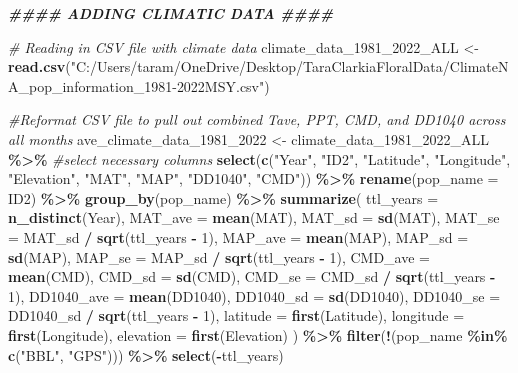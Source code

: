 \documentclass[
]{article}
\newenvironment{Shaded}{\begin{snugshade}}{\end{snugshade}}
\newcommand{\AttributeTok}[1]{\textcolor[rgb]{0.13,0.29,0.53}{#1}}
\newcommand{\CommentTok}[1]{\textcolor[rgb]{0.56,0.35,0.01}{\textit{#1}}}
\newcommand{\DecValTok}[1]{\textcolor[rgb]{0.00,0.00,0.81}{#1}}
\newcommand{\DocumentationTok}[1]{\textcolor[rgb]{0.56,0.35,0.01}{\textbf{\textit{#1}}}}
\newcommand{\FunctionTok}[1]{\textcolor[rgb]{0.13,0.29,0.53}{\textbf{#1}}}
\newcommand{\NormalTok}[1]{#1}
\newcommand{\OtherTok}[1]{\textcolor[rgb]{0.56,0.35,0.01}{#1}}
\newcommand{\SpecialCharTok}[1]{\textcolor[rgb]{0.81,0.36,0.00}{\textbf{#1}}}
\newcommand{\StringTok}[1]{\textcolor[rgb]{0.31,0.60,0.02}{#1}}
\begin{document}
\begin{Shaded}
\begin{Highlighting}[]
\DocumentationTok{\#\#\#\# ADDING CLIMATIC DATA \#\#\#\#}

\CommentTok{\# Reading in CSV file with climate data}
\NormalTok{climate\_data\_1981\_2022\_ALL }\OtherTok{\textless{}{-}} \FunctionTok{read.csv}\NormalTok{(}\StringTok{"C:/Users/taram/OneDrive/Desktop/TaraClarkiaFloralData/ClimateNA\_pop\_information\_1981{-}2022MSY.csv"}\NormalTok{)}

\CommentTok{\#Reformat CSV file to pull out combined Tave, PPT, CMD, and DD1040 across all months}
\NormalTok{ave\_climate\_data\_1981\_2022 }\OtherTok{\textless{}{-}}\NormalTok{ climate\_data\_1981\_2022\_ALL }\SpecialCharTok{\%\textgreater{}\%}
  \CommentTok{\#select necessary columns}
  \FunctionTok{select}\NormalTok{(}\FunctionTok{c}\NormalTok{(}\StringTok{"Year"}\NormalTok{, }\StringTok{"ID2"}\NormalTok{, }\StringTok{"Latitude"}\NormalTok{, }\StringTok{"Longitude"}\NormalTok{, }\StringTok{"Elevation"}\NormalTok{, }\StringTok{"MAT"}\NormalTok{, }\StringTok{"MAP"}\NormalTok{,}
           \StringTok{"DD1040"}\NormalTok{, }\StringTok{"CMD"}\NormalTok{)) }\SpecialCharTok{\%\textgreater{}\%}
  \FunctionTok{rename}\NormalTok{(}\AttributeTok{pop\_name =}\NormalTok{ ID2) }\SpecialCharTok{\%\textgreater{}\%}
  \FunctionTok{group\_by}\NormalTok{(pop\_name) }\SpecialCharTok{\%\textgreater{}\%}
  \FunctionTok{summarize}\NormalTok{(}
    \AttributeTok{ttl\_years =} \FunctionTok{n\_distinct}\NormalTok{(Year),}
    \AttributeTok{MAT\_ave =} \FunctionTok{mean}\NormalTok{(MAT),}
    \AttributeTok{MAT\_sd =} \FunctionTok{sd}\NormalTok{(MAT),}
    \AttributeTok{MAT\_se =}\NormalTok{ MAT\_sd }\SpecialCharTok{/} \FunctionTok{sqrt}\NormalTok{(ttl\_years }\SpecialCharTok{{-}} \DecValTok{1}\NormalTok{),}
    \AttributeTok{MAP\_ave =} \FunctionTok{mean}\NormalTok{(MAP),}
    \AttributeTok{MAP\_sd =} \FunctionTok{sd}\NormalTok{(MAP),}
    \AttributeTok{MAP\_se =}\NormalTok{ MAP\_sd }\SpecialCharTok{/} \FunctionTok{sqrt}\NormalTok{(ttl\_years }\SpecialCharTok{{-}} \DecValTok{1}\NormalTok{),}
    \AttributeTok{CMD\_ave =} \FunctionTok{mean}\NormalTok{(CMD),}
    \AttributeTok{CMD\_sd =} \FunctionTok{sd}\NormalTok{(CMD),}
    \AttributeTok{CMD\_se =}\NormalTok{ CMD\_sd }\SpecialCharTok{/} \FunctionTok{sqrt}\NormalTok{(ttl\_years }\SpecialCharTok{{-}} \DecValTok{1}\NormalTok{),}
    \AttributeTok{DD1040\_ave =} \FunctionTok{mean}\NormalTok{(DD1040),}
    \AttributeTok{DD1040\_sd =} \FunctionTok{sd}\NormalTok{(DD1040),}
    \AttributeTok{DD1040\_se =}\NormalTok{ DD1040\_sd }\SpecialCharTok{/} \FunctionTok{sqrt}\NormalTok{(ttl\_years }\SpecialCharTok{{-}} \DecValTok{1}\NormalTok{),}
    \AttributeTok{latitude =} \FunctionTok{first}\NormalTok{(Latitude),}
    \AttributeTok{longitude =} \FunctionTok{first}\NormalTok{(Longitude),}
    \AttributeTok{elevation =} \FunctionTok{first}\NormalTok{(Elevation)}
\NormalTok{  ) }\SpecialCharTok{\%\textgreater{}\%}
  \FunctionTok{filter}\NormalTok{(}\SpecialCharTok{!}\NormalTok{(pop\_name }\SpecialCharTok{\%in\%} \FunctionTok{c}\NormalTok{(}\StringTok{"BBL"}\NormalTok{, }\StringTok{"GPS"}\NormalTok{))) }\SpecialCharTok{\%\textgreater{}\%}
  \FunctionTok{select}\NormalTok{(}\SpecialCharTok{{-}}\NormalTok{ttl\_years)}


\end{Highlighting}
\end{Shaded}
\end{document}
